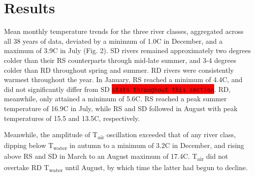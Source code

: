 \documentclass{article}
\begin{document}
\section*{Results}

Mean monthly temperature trends for the three river classes, aggregated across all 38 years of data, deviated by a minimum of 1.0\degree C in December, and a maximum of 3.9\degree C in July (Fig. 2). SD rivers remained approximately two degrees colder than their RS counterparts through mid-late summer, and 3-4 degrees colder than RD throughout spring and summer. RD rivers were consistently warmest throughout the year. In January, RS reached a minimum of 4.4\degree C, and did not significantly differ from SD \colorbox{red}{\lstinline{stats throughout this section}}. RD, meanwhile, only attained a minimum of 5.6\degree C. RS reached a peak summer temperature of 16.9\degree C in July, while RS and SD followed in August with peak temperatures of 15.5 and 13.5\degree C, respectively.

Meanwhile, the amplitude of T\textsubscript{air} oscillation exceeded that of any river class, dipping below T\textsubscript{water} in autumn to a minimum of 3.2\degree C in December, and rising above RS and SD in March to an August maximum of 17.4\degree C. T\textsubscript{air} did not overtake RD T\textsubscript{water} until August, by which time the latter had begun to decline.

\begin{center}
\end{center}
\end{document}
